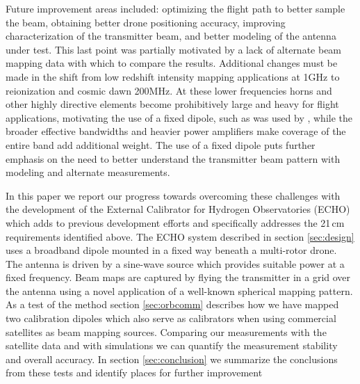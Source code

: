 \documentclass[preprint2,numberedappendix,tighten,twocolappendix]{aastex6}
\begin{document}
Future improvement areas included: optimizing the flight path to better sample the beam, obtaining better drone positioning accuracy, improving characterization of the transmitter beam, and better modeling of the antenna under test. This last point was partially motivated by a lack of alternate beam mapping data with which to compare the results. Additional changes must be made in the shift from low redshift intensity mapping applications at 1GHz to reionization and cosmic dawn 200MHz.  At these lower frequencies horns and other highly directive elements become prohibitively large and heavy for flight applications, motivating the use of a fixed dipole, such as was used by \citet{2014IAWPL..13..169V}, while the broader effective bandwidths and heavier power amplifiers make coverage of the entire band add additional weight. The use of a fixed dipole puts further emphasis on the need to better understand the transmitter beam pattern with modeling and alternate measurements. 


In this paper we report our progress towards overcoming these challenges with the development of the External Calibrator for Hydrogen Observatories (ECHO) which adds to previous development efforts and specifically addresses the 21\,cm requirements identified above.  The ECHO system described in section \ref{sec:design} uses a broadband dipole mounted in a fixed way beneath a multi-rotor drone. The antenna is driven by a sine-wave source which provides suitable power at a fixed frequency. Beam maps are captured by flying the transmitter in a grid over the antenna using a novel application of a well-known spherical mapping pattern.  As a test of the method section \ref{sec:orbcomm} describes how we have mapped two calibration dipoles which also serve as calibrators when using commercial satellites as beam mapping sources.  Comparing our measurements with the satellite data and with simulations we can quantify the measurement stability and overall accuracy.  In section \ref{sec:conclusion} we summarize the conclusions from these tests and identify places for further improvement



\end{document}
